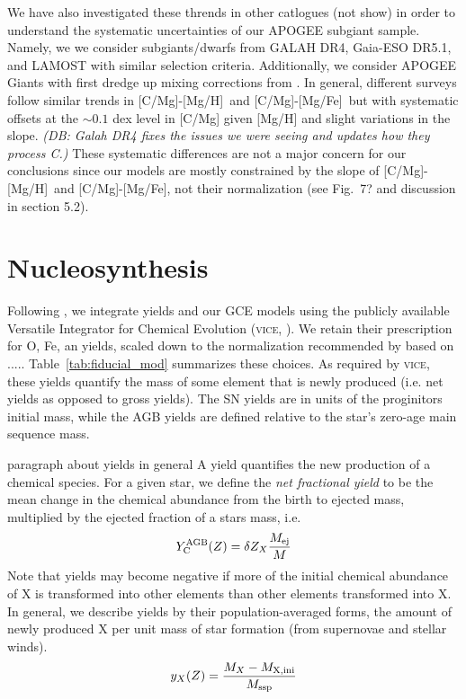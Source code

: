 \documentclass[fleqn,
usenatbib]{mnras}
\newcommand{\VICE}{\textsc{vice}}
\newcommand{\caah}{[C/Mg]-[Mg/H]}
\newcommand{\caafe}{[C/Mg]-[Mg/Fe]}
\newcommand{\dbadd}[1]{{\color{Thistle} #1}}
\newcommand{\dbnote}[1]{ {\color{Thistle} \textit{\small (DB: #1)}} }
\begin{document}

We have also investigated these thrends in other catlogues (not show) in order to understand the systematic uncertainties of our APOGEE subgiant sample.
Namely, we we consider subgiants/dwarfs from GALAH DR4, Gaia-ESO DR5.1, and LAMOST with similar selection criteria. Additionally, we consider APOGEE Giants with first dredge up mixing corrections from \citep{vincenzo+21}.
In general, different surveys follow similar trends in \caah\ and \caafe\ but with systematic offsets at the $\sim{0.1}$ dex level in [C/Mg] given [Mg/H] and slight variations in the slope.
\dbnote{Galah DR4 fixes the issues we were seeing and updates how they process C.}
These systematic differences are not a major concern for our conclusions since our models are mostly constrained by the slope of \caah\ and \caafe,  not their normalization (see Fig.~7? and discussion in section \dbadd{5.2}).

\section{Nucleosynthesis}\label{sec:nucleosynthesis}

Following \citet{james+23}, we integrate yields and our GCE models using the publicly available Versatile Integrator for Chemical Evolution (\VICE, \citealt{JW20}). We retain their prescription for O, Fe, an yields, scaled down to the normalization recommended by \citet{david_fe} based on .....
Table~\ref{tab:fiducial_mod} summarizes these choices. As required by \VICE, these yields quantify the mass of some element that is newly produced (i.e. net yields as opposed to gross yields). The SN yields are in units of the proginitors initial mass, while the AGB yields are defined relative to the star's zero-age main sequence mass.

\dbadd{paragraph about yields in general}
A yield quantifies the new production of a chemical species. For a given star, we define the {\it net fractional yield} to be the mean change in the chemical abundance from the birth to ejected mass, multiplied by the ejected fraction of a stars mass, i.e.
\begin{equation} 
   Y_{\rm C}^{\rm AGB}(Z) = 
    \delta Z_X \frac{M_{\rm ej}}{M}
\end{equation}
Note that yields may become negative if more of the initial chemical abundance of X is transformed into other elements than other elements transformed into X.
In general, we describe yields by their population-averaged forms, the amount of newly produced X per unit mass of star formation (from supernovae and stellar winds).
\begin{equation} 
   y_{X}(Z) = 
    \frac{M_X - M_{\rm X, ini}}{M_{\rm ssp}}
\end{equation}
\end{document}
